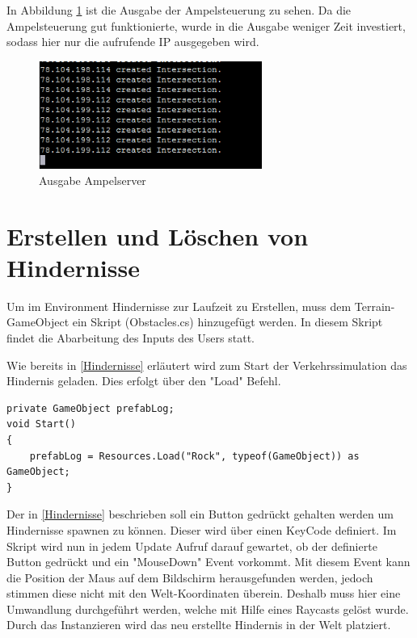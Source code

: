 In Abbildung \ref{img:ampel} ist die Ausgabe der Ampelsteuerung zu sehen. Da die Ampelsteuerung gut funktionierte, wurde in die Ausgabe weniger Zeit investiert, sodass hier nur die aufrufende IP ausgegeben wird.

\begin{figure}[H]
\begin{center}
	\includegraphics[width=0.65\textwidth]{BilderAllgemein/ampelserver.png}
\end{center}

	\caption{Ausgabe Ampelserver}

	\label{img:ampel}
\end{figure}



\section{Erstellen und Löschen von Hindernisse}

Um im Environment Hindernisse zur Laufzeit zu Erstellen, muss dem Terrain-GameObject ein Skript (Obstacles.cs) hinzugefügt werden. In diesem Skript findet die Abarbeitung des Inputs des Users statt.

Wie bereits in \ref{Hindernisse} erläutert wird zum Start der Verkehrssimulation das Hindernis geladen. Dies erfolgt über den "Load" Befehl.

\begin{lstlisting}[caption={Laden des Hindernisses},label={lst:Hinderniss_laden}]
private GameObject prefabLog;
void Start()
{
	prefabLog = Resources.Load("Rock", typeof(GameObject)) as GameObject;
}
\end{lstlisting}

Der in \ref{Hindernisse} beschrieben soll ein Button gedrückt gehalten werden um Hindernisse spawnen zu können. Dieser wird über einen KeyCode definiert. Im Skript wird nun in jedem Update Aufruf darauf gewartet, ob der definierte Button gedrückt und ein "MouseDown" Event vorkommt. Mit diesem Event kann die Position der Maus auf dem Bildschirm herausgefunden werden, jedoch stimmen diese nicht mit den Welt-Koordinaten überein. Deshalb muss hier eine Umwandlung durchgeführt werden, welche mit Hilfe eines Raycasts gelöst wurde. Durch das Instanzieren wird das neu erstellte Hindernis in der Welt platziert.

